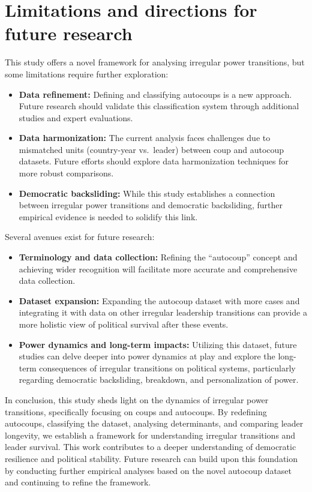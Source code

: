 \documentclass[
  12pt,
]{report}
\begin{document}
\section{Limitations and directions for future
research}\label{limitations-and-directions-for-future-research}

This study offers a novel framework for analysing irregular power
transitions, but some limitations require further exploration:

\begin{itemize}
\item
  \textbf{Data refinement:} Defining and classifying autocoups is a new
  approach. Future research should validate this classification system
  through additional studies and expert evaluations.
\item
  \textbf{Data harmonization:} The current analysis faces challenges due
  to mismatched units (country-year vs.~leader) between coup and
  autocoup datasets. Future efforts should explore data harmonization
  techniques for more robust comparisons.
\item
  \textbf{Democratic backsliding:} While this study establishes a
  connection between irregular power transitions and democratic
  backsliding, further empirical evidence is needed to solidify this
  link.
\end{itemize}

Several avenues exist for future research:

\begin{itemize}
\item
  \textbf{Terminology and data collection:} Refining the ``autocoup''
  concept and achieving wider recognition will facilitate more accurate
  and comprehensive data collection.
\item
  \textbf{Dataset expansion:} Expanding the autocoup dataset with more
  cases and integrating it with data on other irregular leadership
  transitions can provide a more holistic view of political survival
  after these events.
\item
  \textbf{Power dynamics and long-term impacts:} Utilizing this dataset,
  future studies can delve deeper into power dynamics at play and
  explore the long-term consequences of irregular transitions on
  political systems, particularly regarding democratic backsliding,
  breakdown, and personalization of power.
\end{itemize}

In conclusion, this study sheds light on the dynamics of irregular power
transitions, specifically focusing on coups and autocoups. By redefining
autocoups, classifying the dataset, analysing determinants, and
comparing leader longevity, we establish a framework for understanding
irregular transitions and leader survival. This work contributes to a
deeper understanding of democratic resilience and political stability.
Future research can build upon this foundation by conducting further
empirical analyses based on the novel autocoup dataset and continuing to
refine the framework.
\end{document}
